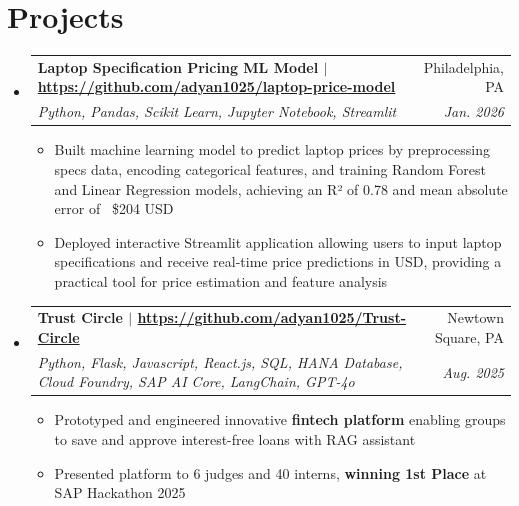 \documentclass[letterpaper,10pt]{article}
\makeatletter
\newcommand{\rsection}[1]{
  \section{#1}
}
\newenvironment{rsectionlist}{
  \begin{itemize}[leftmargin=*, itemsep=0.75em, label={}]
}{
  \end{itemize}
  \vspace*{-1.5em}

}
\newcommand{\rsectionitem}[4]{
  \item \begin{tabular*}{0.98\textwidth}[t]{l@{\extracolsep{\fill}}r}
      \textbf{#1} & #2 \\
      \textit{#3} & \textit{\small #4}
    \end{tabular*}
}
\newcommand{\rsectiondesc}[1]{
  \begin{minipage}{0.98\textwidth} #1 \end{minipage}
  \vspace*{-0.25em}
}
\newenvironment{rpointlist}{
  \begin{itemize}
  \setlength{\itemsep}{0pt}
  \setlength{\parskip}{2pt}
  \setlength{\parsep}{0pt}
}{
  \end{itemize}
}
\newcommand{\rpointlone}[1]{
  \item \small{#1}
}
\newcommand{\highlight}[1]{\textbf{\small #1}}
\makeatother
\begin{document}
\rsection{Projects}
  \begin{rsectionlist}

    \rsectionitem
      {Laptop Specification Pricing ML Model $|$ \faLink\hspace{0.3em}\url{https://github.com/adyan1025/laptop-price-model}}
      {Philadelphia, PA}
      {Python, Pandas, Scikit Learn, Jupyter Notebook, Streamlit}
      {\small \itshape Jan. 2026}

      \rsectiondesc{
          \begin{rpointlist}
             \rpointlone{Built machine learning model to predict laptop prices by preprocessing specs data, encoding categorical features, and training Random Forest and Linear Regression models, achieving an R² of 0.78 and mean absolute error of ~\$204 USD}
             \rpointlone{Deployed interactive Streamlit application allowing users to input laptop specifications and receive real-time price predictions in USD, providing a practical tool for price estimation and feature analysis}
          \end{rpointlist}
        }

    \rsectionitem
      {Trust Circle $|$ \faLink\hspace{0.3em}\url{https://github.com/adyan1025/Trust-Circle}}
      {Newtown Square, PA}
      {Python, Flask, Javascript, React.js, SQL, HANA Database, Cloud Foundry, SAP AI Core, LangChain, GPT-4o}
      {\small \itshape Aug. 2025}

      \rsectiondesc{
          \begin{rpointlist}
             \rpointlone{Prototyped and engineered innovative \highlight{fintech platform} enabling groups to save and approve interest-free loans with RAG assistant}
             \rpointlone{Presented platform to 6 judges and 40 interns, \highlight{winning 1st Place} at SAP Hackathon 2025}
          \end{rpointlist}
        }
  

        

\end{rsectionlist}
\end{document}
